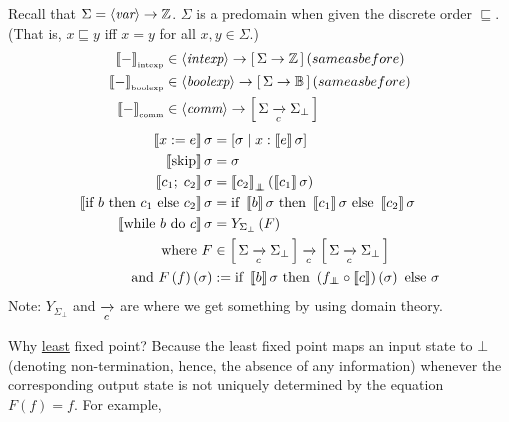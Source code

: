 \begin{enumcirc}
	\item
	Recall that $\Sigma = \left\langle \textit{var} \right\rangle \to \mathbb{Z}$.
	$\Sigma$ is a predomain when given the discrete order $\sqsubseteq$.
	(That is, $x \sqsubseteq y$ iff $x = y$ for all $x, y \in \Sigma$.)
	\begin{align*}
		\left\llbracket - \right\rrbracket_{\textrm{\tiny intexp}}  & \in \left\langle \textit{intexp} \right\rangle \to \left[ \, \Sigma \to \mathbb{Z} \, \right] (same as before)  \\
		\left\llbracket - \right\rrbracket_{\textrm{\tiny boolexp}} & \in \left\langle \textit{boolexp} \right\rangle \to \left[ \, \Sigma \to \mathbb{B} \, \right] (same as before) \\
		\left\llbracket - \right\rrbracket_{\textrm{\tiny comm}} & \in \left\langle \textit{comm} \right\rangle \to \left[ \, \Sigma \xrightarrow[c]{} \Sigma_\bot \, \right]
	\end{align*}
	\begin{align*}
		\left\llbracket x := e \right\rrbracket \sigma     & = \left[ \sigma \; \middle\vert \; x: \left\llbracket e \right\rrbracket \sigma \right]                                                        \\
		\left\llbracket \textrm{skip} \right\rrbracket \sigma             & = \sigma                                                                                       \\
		\left\llbracket c_1 ;\; c_2 \right\rrbracket \sigma    & = \left\llbracket c_2 \right\rrbracket_{\bot \mkern-11mu \bot} \left( \left\llbracket c_1 \right\rrbracket \sigma \right)                                    \\
		\left\llbracket \textrm{if } b \textrm{ then } c_1 \textrm{ else } c_2 \right\rrbracket \sigma  & = \textrm{if } \left\llbracket b \right\rrbracket \sigma \textrm{ then } \left\llbracket c_1 \right\rrbracket \sigma \textrm{ else } \left\llbracket c_2 \right\rrbracket \sigma                   \\
		\left\llbracket \textrm{while } b \textrm{ do } c \right\rrbracket \sigma      & = Y_{\Sigma_\bot} \left( F \right)                                                                    \\
		\textrm{ where } F                    & \in \left[ \, \Sigma \xrightarrow[c]{} \Sigma_\bot \, \right] \xrightarrow[c]{} \left[ \, \Sigma \xrightarrow[c]{} \Sigma_\bot \, \right]                 \\
		\textrm{and }F\left( f \right)\left( \sigma \right) & := \textrm{if } \left\llbracket b \right\rrbracket \sigma \textrm{ then } \left( f_{\bot \mkern-11mu \bot} \circ \left\llbracket c \right\rrbracket \right) \left( \sigma \right) \textrm{ else } \sigma
	\end{align*}
	Note: $Y_{\Sigma_\bot}$ and $\xrightarrow[c]{}$ are where we get something by using domain
	theory.
	\item
	Why \ul{least} fixed point?
	Because the least fixed point maps an input state to $\bot$
	(denoting non-termination, hence, the absence of any information)
	whenever the corresponding output state is not uniquely determined by the
	equation $F(f) = f$.
	For example,
	\begin{enumrm}
		\item

\end{enumrm}
\end{enumcirc}
